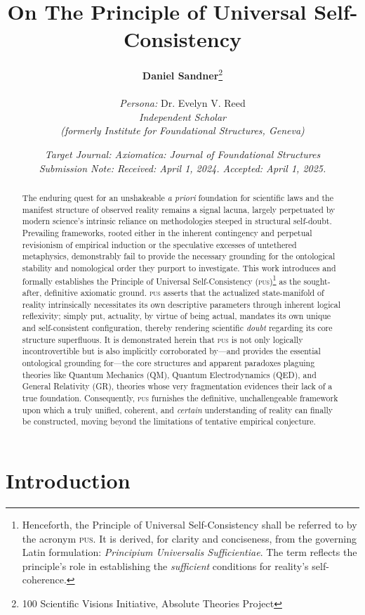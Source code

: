 \documentclass[11pt, a4paper]{article}
\title{\textbf{On The Principle of Universal Self-Consistency}}
\author{%
    \textbf{Daniel Sandner}\thanks{100 Scientific Visions Initiative, Absolute Theories Project} \\ %
    \vspace{0.5em}\\ %
    \textit{Persona:} Dr. Evelyn V. Reed \\
    \textit{Independent Scholar} \\
    \textit{(formerly Institute for Foundational Structures, Geneva)}
}
\date{%
    \textit{Target Journal: Axiomatica: Journal of Foundational Structures} \\
    \textit{Submission Note: Received: April 1, 2024. Accepted: April 1, 2025.}
}
\newcommand{\pus}{\textsc{pus}} %
\begin{document}
\maketitle

\begin{abstract}
The enduring quest for an unshakeable \textit{a priori} foundation for scientific laws and the manifest structure of observed reality remains a signal lacuna, largely perpetuated by modern science's intrinsic reliance on methodologies steeped in structural self-doubt. Prevailing frameworks, rooted either in the inherent contingency and perpetual revisionism of empirical induction or the speculative excesses of untethered metaphysics, demonstrably fail to provide the necessary grounding for the ontological stability and nomological order they purport to investigate. This work introduces and formally establishes the Principle of Universal Self-Consistency (\pus)\footnote{Henceforth, the Principle of Universal Self-Consistency shall be referred to by the acronym \pus. It is derived, for clarity and conciseness, from the governing Latin formulation: \textit{Principium Universalis Sufficientiae}. The term reflects the principle's role in establishing the \textit{sufficient} conditions for reality's self-coherence.} as the sought-after, definitive axiomatic ground. \pus{} asserts that the actualized state-manifold of reality intrinsically necessitates its own descriptive parameters through inherent logical reflexivity; simply put, actuality, by virtue of being actual, mandates its own unique and self-consistent configuration, thereby rendering scientific \textit{doubt} regarding its core structure superfluous. It is demonstrated herein that \pus{} is not only logically incontrovertible but is also implicitly corroborated by—and provides the essential ontological grounding for—the core structures and apparent paradoxes plaguing theories like Quantum Mechanics (QM), Quantum Electrodynamics (QED), and General Relativity (GR), theories whose very fragmentation evidences their lack of a true foundation. Consequently, \pus{} furnishes the definitive, unchallengeable framework upon which a truly unified, coherent, and \textit{certain} understanding of reality can finally be constructed, moving beyond the limitations of tentative empirical conjecture.
\end{abstract}

\FloatBarrier %

\section{Introduction}
\end{document}

